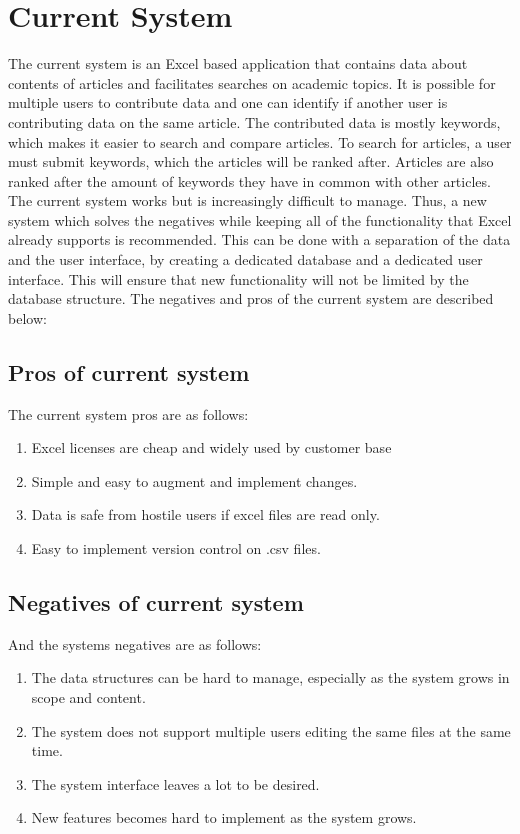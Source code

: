 \section{Current System}
The current system is an Excel based application that contains data about contents of articles and facilitates searches on academic topics. It is possible for multiple users to contribute data and one can identify if another user is contributing data on the same article. The contributed data is mostly keywords, which makes it easier to search and compare articles. To search for articles, a user must submit keywords, which the articles will be ranked after. Articles are also ranked after the amount of keywords they have in common with other articles. The current system works but is increasingly difficult to manage. Thus, a new system which solves the negatives while keeping all of the functionality that Excel already supports is recommended. This can be done with a separation of the data and the user interface, by creating a dedicated database and a dedicated user interface. This will ensure that new functionality will not be limited by the database structure. The negatives and pros of the current system are described below:

\subsection{Pros of current system}
The current system pros are as follows:

\begin{enumerate}
	\item Excel licenses are cheap and widely used by customer base
	\item Simple and easy to augment and implement changes.
	\item Data is safe from hostile users if excel files are read only. 
	\item Easy to implement version control on .csv files. 
\end{enumerate}

\subsection{Negatives of current system} 
And the systems negatives are as follows: 

\begin{enumerate}
	\item The data structures can be hard to manage, especially as the system grows in scope and content.
	\item The system does not support multiple users editing the same files at the same time.
	\item The system interface leaves a lot to be desired.
	\item New features becomes hard to implement as the system grows.
\end{enumerate}
